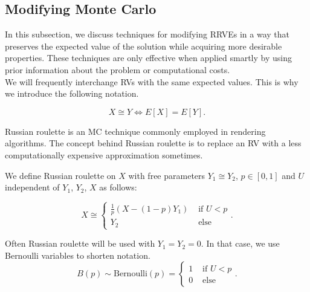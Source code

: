 \documentclass[a4paper,12pt]{article}
\begin{document}

\subsection{Modifying Monte Carlo}

In this subsection, we discuss techniques for modifying RRVEs
in a way that preserves the expected value of the solution while
acquiring more desirable properties. These techniques are only
effective when applied smartly by using prior information
about the problem or computational costs. \\

We will frequently interchange RVs with the same expected values.
This is why we introduce the following notation.
\begin{notation}[$\cong$]
  \[
    X \cong Y \iff E[X]=E[Y]
    .\]
\end{notation}

Russian roulette is an MC technique commonly employed in rendering algorithms.
The concept behind Russian roulette is to replace an RV with a
less computationally expensive approximation sometimes.

\begin{definition} \label{Russian roulette}
  We define Russian roulette on $X$ with free parameters
  $Y_{1} \cong Y_{2}$, $p \in [0,1]$
  and $U$ independent of $Y_{1}$, $Y_{2}$, $X$
  as follows:

  \begin{equation}
    X \cong
    \begin{cases}
      \frac{1}{p}(X - (1-p)Y_{1}) & \text{ if } U < p \\
      Y_{2}                       & \text{ else }
    \end{cases}.
  \end{equation}
\end{definition}


\begin{notation}[$B(p)$]
  Often Russian roulette will be used with $Y_{1}= Y_{2}= 0$.
  In that case, we use Bernoulli variables to shorten notation.
  \begin{equation}
    B(p) \sim \text{Bernoulli}(p) =
    \begin{cases}
      1 & \text{ if } U<p \\
      0 & \text{ else }
    \end{cases} .
  \end{equation}
\end{notation}
\end{document}
